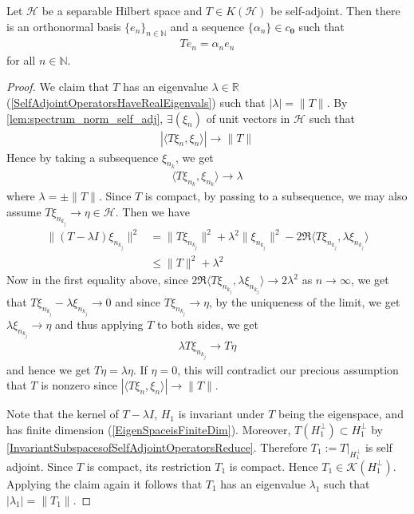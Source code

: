 \begin{theorem}
  \label{SpectralTheoremforCompactSAOperators}
  Let $\mathcal{H}$ be a separable Hilbert space and $T \in K(\mathcal{H})$ be
  self-adjoint. Then there is an orthonormal basis $ \{ e_n \}_{n \in
  \mathbb{N}}$ and a sequence $\{\alpha_n\} \in c_{\textbf{0}}$ such that
  \begin{align*}
    T e_n = \alpha_n e_n
  \end{align*}
  for all $n \in \mathbb{N}$.
\end{theorem}
\begin{proof}
  We claim that $T$ has an eigenvalue $\lambda \in \mathbb{R}$
  (\autoref{SelfAdjointOperatorsHaveRealEigenvals}) such
  that $|\lambda| = \|T\|$. By   \autoref{lem:spectrum_norm_self_adj}, $\exists
  (\xi_n)$ of unit vectors in $\mathcal{H}$ such that
  \begin{align*}
    |\langle T  \xi_n , \xi_n \rangle| \to \|T\|
  \end{align*}
  Hence by taking a subsequence $\xi_{n_k}$, we get
  \begin{align*}
    \langle T \xi_{n_k} ,  \xi_{n_k} \rangle \to \lambda
  \end{align*}
  where $\lambda = \pm \|T\|$. Since $T$ is compact, by passing to a
  subsequence, we may also assume $T \xi_{n_{k_j}} \to \eta \in \mathcal{H}$.
  Then we have
  \begin{align*}
    \|(T - \lambda I)\xi_{n_{k_j}}\|^2 &= \|T \xi_{n_{k_j}}\|^2 +
    \lambda^2 \|\xi_{n_{k_j}}\|^2 - 2 \Re \langle T \xi_{n_{k_j}}
    , \lambda \xi_{n_{k_j}}  \rangle  \\
    & \le \|T\|^2 + \lambda^2
  \end{align*}
  Now in the first equality above, since $2 \Re \langle T \xi_{n_{k_j}}
  ,\lambda\xi_{n_{k_j}}  \rangle \to 2\lambda^2$ as $n \to \infty$, we get
  that $T \xi_{n_{k_j}} - \lambda\xi_{n_{k_j}} \to 0$ and since $T \xi_{n_{k_j}}
  \to \eta$, by the uniqueness of the limit, we get $\lambda
  \xi_{n_{k_j}} \to \eta$ and thus applying $T$ to both sides, we get
  \begin{align*}
    \lambda T \xi_{n_{k_j}} \to  T \eta
  \end{align*}
  and hence we get $T \eta = \lambda \eta$. If $\eta= 0$, this will
  contradict our precious assumption that $T$ is nonzero since
  $|\langle T \xi_n , \xi_n \rangle | \to \|T\|$.

  Note that the kernel of $T - \lambda I$, $H_1$ is invariant under
  $T$ being the eigenspace, and has finite dimension
  (\autoref{EigenSpaceisFiniteDim}).
  Moreover, $T(H_1^\perp) \subset H_1^\perp$ by
  \autoref{InvariantSubspacesofSelfAdjointOperatorsReduce}.
  Therefore $T_1:= T|_{H_1^\perp}$ is
  self adjoint. Since $T$ is compact, its restriction $T_1$ is
  compact. Hence $T_1 \in \mathcal{K}(H_1^\perp)$. Applying the claim again it
  follows that $T_1$ has an eigenvalue $\lambda_1$ such that
  $|\lambda_1| = \|T_1\|$.


\end{proof}
